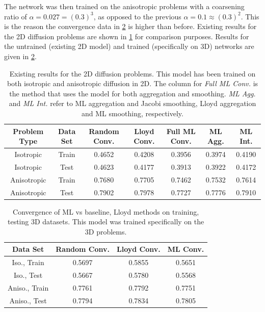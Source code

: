 \documentclass{article}
\begin{document}
The network was then trained on the anisotropic problems with a coarsening ratio of $\alpha=0.027=\left(0.3\right)^3$, as opposed to the previous $\alpha=0.1\approx\left(0.3\right)^2$.  This is the reason the convergence data in \cref{tab:conv_3d} is higher than before.  Existing results for the 2D diffusion problems are shown in \cref{tab:conv_2d} for comparison purposes.  Results for the untrained (existing 2D model) and trained (specifically on 3D) networks are given in \cref{tab:conv_3d}.

\begin{table}[h]
  \centering
  \begin{tabular}{c c c c c c c}
    \textbf{Problem Type} & \textbf{Data Set} & \textbf{Random Conv.} & \textbf{Lloyd Conv.} & \textbf{Full ML Conv.} & \textbf{ML Agg.} & \textbf{ML Int.} \\
    \hline
    Isotropic & Train & 0.4652 & 0.4208 & 0.3956 & 0.3974 & 0.4190 \\
    Isotropic & Test & 0.4623 & 0.4177 & 0.3913 & 0.3922 & 0.4172 \\
    Anisotropic & Train & 0.7680 & 0.7705 & 0.7462 & 0.7532 & 0.7614 \\
    Anisotropic & Test & 0.7902 & 0.7978 & 0.7727 & 0.7776 & 0.7910 \\
    \hline
  \end{tabular}
  \caption{Existing results for the 2D diffusion problems.  This model has been trained on both isotropic and anisotropic diffusion in 2D.  The column for \textit{Full ML Conv.} is the method that uses the model for both aggregation and smoothing.  \textit{ML Agg.} and \textit{ML Int.} refer to ML aggregation and Jacobi smoothing, Lloyd aggregation and ML smoothing, respectively.}
  \label{tab:conv_2d}
\end{table}

\begin{table}[h]
  \centering
  \begin{tabular}{c c c c}
    \textbf{Data Set} & \textbf{Random Conv.} & \textbf{Lloyd Conv.} & \textbf{ML Conv.} \\
    \hline
    Iso., Train & 0.5697 & 0.5855 & 0.5651 \\
    Iso., Test & 0.5667 & 0.5780 & 0.5568 \\
    \hline
    Aniso., Train & 0.7761 & 0.7792 & 0.7751 \\
    Aniso., Test & 0.7794 & 0.7834 & 0.7805 \\
    \hline
  \end{tabular}
  \caption{Convergence of ML vs baseline, Lloyd methods on training, testing 3D datasets.  This model was trained specifically on the 3D problems.}
  \label{tab:conv_3d}
\end{table}
\end{document}
